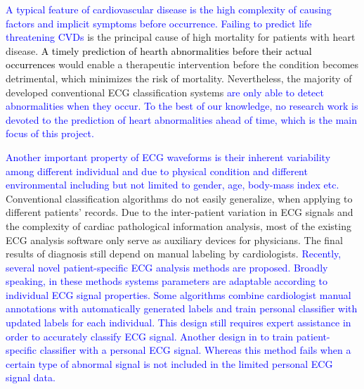 \textcolor{blue}{A typical feature of cardiovascular disease is the high complexity of causing factors and implicit symptoms before occurrence\cite{wilson1998prediction, whooley2008depressive}. Failing to predict life threatening CVDs} %
is the principal cause of high mortality for patients with heart disease. 
\textcolor{black}{A timely prediction of hearth abnormalities before their actual occurrences }%
would enable a therapeutic intervention %
before the condition becomes detrimental, which minimizes the risk of mortality. Nevertheless, the majority of developed conventional ECG classification systems  \textcolor{blue}{are only able to detect abnormalities when they occur. To the best of our knowledge, no research work is devoted to the prediction of heart abnormalities ahead of time, which is the main focus of this project\cite{jambukia2015classification, advancewarning}.} %

\textcolor{blue}{Another important property of ECG waveforms is their inherent variability among different individual and due to physical condition and different environmental including but not limited to gender, age, body-mass index etc\cite{agesex,intervaria}.}
Conventional classification algorithms do not easily generalize, when %
applying to different patients' records\cite{llamedo2012automatic}. 
Due to the inter-patient variation in ECG signals and the complexity of cardiac pathological information analysis, most of the existing ECG analysis software only serve as auxiliary devices for physicians. The final results of diagnosis still depend on manual labeling by cardiologists. \textcolor{blue}{Recently, several novel patient-specific ECG analysis methods are proposed. Broadly speaking, in these methods systems parameters are adaptable according to individual ECG signal properties. Some algorithms combine cardiologist manual annotations with automatically generated labels and train personal classifier with updated labels for each individual. This design still requires expert assistance in order to accurately classify ECG signal. Another design in to train patient-specific classifier with a personal ECG signal. Whereas this method fails when a certain type of abnormal signal is not included in the limited personal ECG signal data.}%


